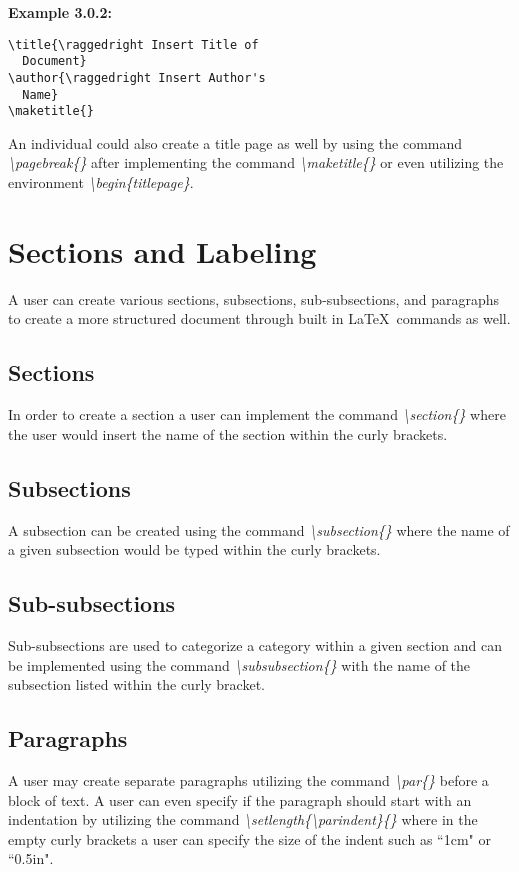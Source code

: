 \documentclass[11pt,twocolumn]{article}
\begin{document}
\noindent \textbf{Example 3.0.2:}
\begin{verbatim}
\title{\raggedright Insert Title of
  Document}
\author{\raggedright Insert Author's
  Name}
\maketitle{}
\end{verbatim}

An individual could also create a title page as well by using the command \textit{\textbackslash pagebreak\{\}} after implementing the command \textit{\textbackslash maketitle\{\}} or even utilizing the environment \textit{\textbackslash begin\{titlepage\}}.

\section{Sections and Labeling}
A user can create various sections, subsections, sub-subsections, and paragraphs to create a more structured document through built in \LaTeX\ commands as well.

\subsection{Sections}
In order to create a section a user can implement the command \textit{\textbackslash section\{\}} where the user would insert the name of the section within the curly brackets. 

\subsection{Subsections}
A subsection can be created using the command \textit{\textbackslash subsection\{\}} where the name of a given subsection would be typed within the curly brackets.

\subsection{Sub-subsections}
Sub-subsections are used to categorize a category within a given section and can be implemented using the command \textit{\textbackslash subsubsection\{\}} with the name of the subsection listed within the curly bracket.

\subsection{Paragraphs}
A user may create separate paragraphs utilizing the command \textit{\textbackslash par\{\}} before a block of text. A user can even specify if the paragraph should start with an indentation by utilizing the command \textit{\textbackslash setlength\{\textbackslash parindent\}\{\}} where in the empty curly brackets a user can specify the size of the indent such as ``1cm" or ``0.5in".
\end{document}
